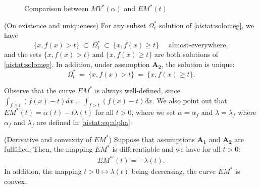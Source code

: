 \begin{center}
\begin{figure}
\caption{Comparison between $MV^*(\alpha)$ and $EM^*(t)$}
\label{aistat:MVcurve}
\end{figure}
\end{center}



\begin{lemma}{\sc (On existence and uniqueness)}
\label{aistat:evident}
For any subset $\Omega^*_t$ solution of \eqref{aistat:solomeg}, we have
$$\{x, f(x) > t\} ~\subset~ \Omega^*_t ~\subset~ \{x, f(x) \ge t\} \text{~~~~almost-everywhere},$$
 and the sets $\{x, f(x) > t\}$ and $\{x, f(x) \ge t\}$ are both solutions of \eqref{aistat:solomeg}.
In addition, under assumption $\mathbf{A_2}$, the solution is unique:%
$$\Omega_t^*~=~ \{x, f(x) > t\}~=~ \{x, f(x) \ge t\}.$$%
\end{lemma}
 Observe that the curve $EM^*$ is always well-defined,
since  $ \int_{f \ge t}(f(x)-t)dx = \int_{f > t}(f(x)-t)dx$. We also point out that $EM^*(t)=\alpha(t)-t\lambda(t)$ for all $t>0$, where we set $\alpha = \alpha_f$ and
$\lambda = \lambda_f$ where $\alpha_f$ and $\lambda_f$ are defined in \eqref{aistat:eq:alpha}. %
\begin{proposition}{\sc (Derivative and convexity of $EM^*$)}  Suppose that assumptions $\mathbf{A_1}$ and $\mathbf{A_2}$ are fullfilled. Then, the mapping $EM^*$ is differentiable and we have for all $t>0$:
\label{aistat:derive}
\begin{eqnarray*}
 EM^{*'}(t)=-\lambda(t). 
\end{eqnarray*}
In addition, the mapping $t>0 \mapsto \lambda(t)$ being decreasing, the curve $EM^*$ is convex.
\end{proposition}

